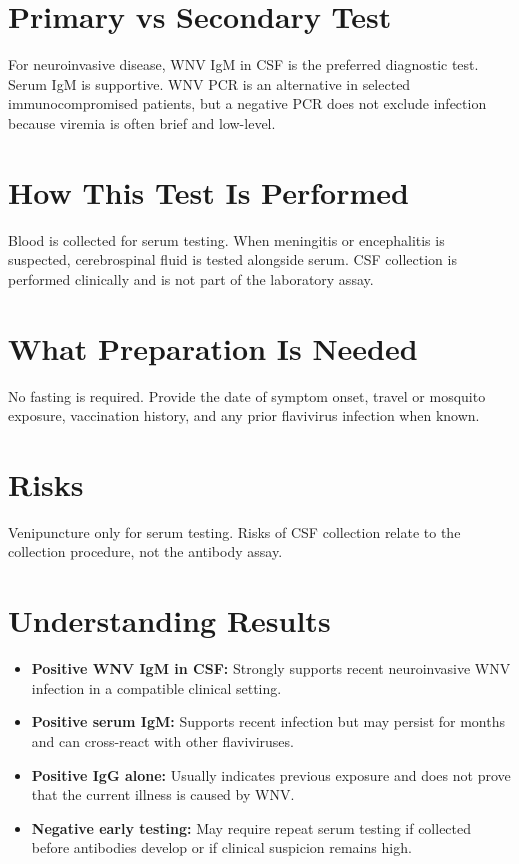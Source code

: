 \section*{Primary vs Secondary Test}
For neuroinvasive disease, WNV IgM in CSF is the preferred diagnostic test. Serum IgM is supportive. WNV PCR is an alternative in selected immunocompromised patients, but a negative PCR does not exclude infection because viremia is often brief and low-level.

\section*{How This Test Is Performed}
Blood is collected for serum testing. When meningitis or encephalitis is suspected, cerebrospinal fluid is tested alongside serum. CSF collection is performed clinically and is not part of the laboratory assay.

\section*{What Preparation Is Needed}
No fasting is required. Provide the date of symptom onset, travel or mosquito exposure, vaccination history, and any prior flavivirus infection when known.

\section*{Risks}
Venipuncture only for serum testing. Risks of CSF collection relate to the collection procedure, not the antibody assay.

\section*{Understanding Results}
\begin{itemize}
  \item \textbf{Positive WNV IgM in CSF:} Strongly supports recent neuroinvasive WNV infection in a compatible clinical setting.
  \item \textbf{Positive serum IgM:} Supports recent infection but may persist for months and can cross-react with other flaviviruses.
  \item \textbf{Positive IgG alone:} Usually indicates previous exposure and does not prove that the current illness is caused by WNV.
  \item \textbf{Negative early testing:} May require repeat serum testing if collected before antibodies develop or if clinical suspicion remains high.
\end{itemize}


